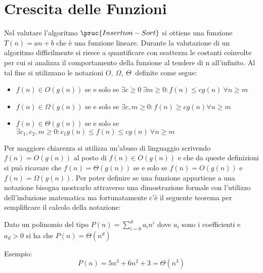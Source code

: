 \chapter{Crescita delle Funzioni}
Nel valutare l'algoritmo $\proc{Insertion-Sort}$ si ottiene una funzione $T(n) = an + b$ che
è una funzione lineare.\newline
Durante la valutazione di un algoritmo difficilmente si riesce a quantificare con
esattezza le costanti coinvolte per cui si analizza il comportamento della funzione
al tendere di n all'infinito.\newline
Al tal fine si utilizzano le notazioni $O,\ \Omega,\ \Theta\ $ definite come segue:

\begin{itemize}
  \item $f(n) \in O(g(n))$ se e solo se $\exists c \geq 0\ \exists m \geq 0 : f(n) \leq cg(n)\ \forall n \geq m$
  \item $f(n) \in \Omega(g(n))$ se e solo se $\exists c, m \geq 0 : f(n) \geq cg(n) \forall n \geq m$
  \item $f(n) \in \Theta(g(n))$ se e solo se $\exists c_1,c_2,m \geq 0 :
        c_1g(n) \leq f(n) \leq cg(n)\ \forall n \geq m$
\end{itemize}
Per maggiore chiarezza si utilizza un'abuso di linguaggio scrivendo $f(n) = O(g(n))$
al posto di $f(n) \in O(g(n))$ e che da queste definizioni si può ricavare che $f(n) = \Theta(g(n))$
se e solo se $f(n) = O(g(n))$ e $f(n) = \Omega(g(n))$.
Per poter definire se una funzione appartiene a una notazione bisogna mostrarlo attraverso
una dimostrazione formale con l'utilizzo dell'induzione matematica ma fortunatamente
c'è il seguente teorema per semplificare il calcolo della notazione:
\begin{thm}
Dato un polinomio del tipo $P(n) = \sum _{i = 0} ^ d a_i n^i$ dove $a_i$ sono i coefficienti
e $a_d > 0$ si ha che $P(n) = \Theta(n^d)$
\end{thm}
Esempio:
\begin{equation*}
  P(n) = 5n^3 + 6n^2 + 3 = \Theta(n^3)
\end{equation*}
